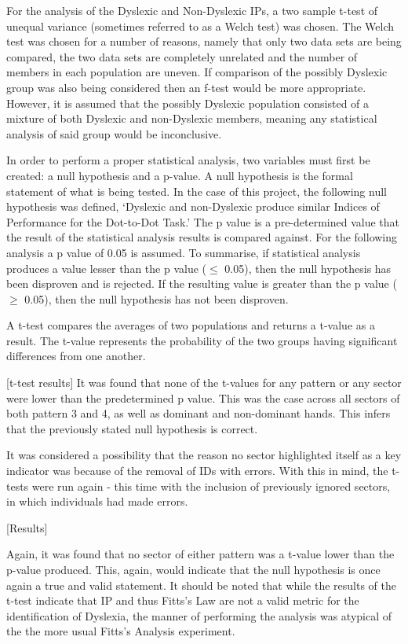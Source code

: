 		For the analysis of the Dyslexic and Non-Dyslexic IPs, a two sample t-test of unequal variance (sometimes referred to as a Welch test)  was chosen. The Welch test was chosen for a number of reasons, namely that only two data sets are being compared, the two data sets are completely unrelated and the number of members in each population are uneven. If comparison of the possibly Dyslexic group was also being considered then an f-test would be more appropriate. However, it is assumed that the possibly Dyslexic population consisted of a mixture of both Dyslexic and non-Dyslexic members, meaning any statistical analysis of said group would be inconclusive.

		In order to perform a proper statistical analysis, two variables must first be created: a null hypothesis and a p-value. A null hypothesis is the formal statement of what is being tested. In the case of this project, the following null hypothesis was defined,
		‘Dyslexic and non-Dyslexic produce similar Indices of Performance for the Dot-to-Dot Task.’
		The p value is a pre-determined value that the result of the statistical analysis results is compared against. For the following analysis a p value of 0.05 is assumed. To summarise, if statistical analysis produces a value lesser than the p value ($\leq$ 0.05), then the null hypothesis has been disproven and is rejected. If the resulting value is greater than the p value ($\geq$ 0.05), then the null hypothesis has not been disproven.

		A t-test compares the averages of two populations and returns a t-value as a result. The t-value represents the probability of the two groups having significant differences from one  another. 

		[t-test results]
		It was found that none of the t-values for any pattern or any sector were lower than the predetermined p value. This was the case across all sectors of both pattern 3 and 4, as well as dominant and non-dominant hands. This infers that the previously stated null hypothesis is correct. 

		It was considered a possibility that the reason no sector highlighted itself as a key indicator was because of the removal of IDs with errors. With this in mind, the t-tests were run again - this time with the inclusion of previously ignored sectors, in which individuals had made errors.

		[Results]

		Again, it was found that no sector of either pattern was a t-value lower than the p-value produced. This, again, would indicate that the null hypothesis is once again a true and valid statement.
		It should be noted that while the results of the t-test indicate that IP and thus Fitts’s Law are not a valid metric for the identification of Dyslexia, the manner of performing the analysis was atypical of the the more usual Fitts’s Analysis experiment.

